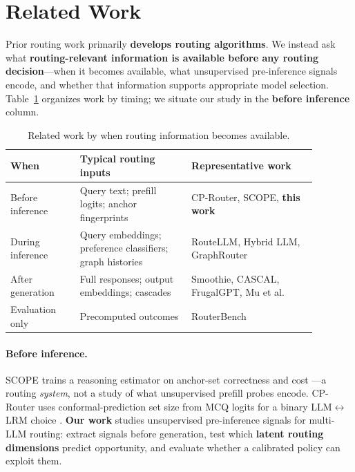 
\section{Related Work}
\label{sec:related}

Prior routing work primarily \textbf{develops routing algorithms}.
We instead ask what \textbf{routing-relevant information is available before any routing decision}---when it becomes available, what unsupervised pre-inference signals encode, and whether that information supports appropriate model selection.
Table~\ref{tab:landscape} organizes work by timing; we situate our study in the \textbf{before inference} column.

\begin{table}[t]
  \centering
  \small
  \begin{tabular}{p{0.20\linewidth}p{0.32\linewidth}p{0.36\linewidth}}
    \toprule
    \textbf{When} & \textbf{Typical routing inputs} & \textbf{Representative work} \\
    \midrule
    Before inference &
      Query text; prefill logits; anchor fingerprints &
      CP-Router, SCOPE, \textbf{this work} \\
    During inference &
      Query embeddings; preference classifiers; graph histories &
      RouteLLM, Hybrid LLM, GraphRouter \\
    After generation &
      Full responses; output embeddings; cascades &
      Smoothie, CASCAL, FrugalGPT, Mu et al. \\
    Evaluation only &
      Precomputed outcomes &
      RouterBench \\
    \bottomrule
  \end{tabular}
  \caption{Related work by when routing information becomes available.}
  \label{tab:landscape}
\end{table}

\paragraph{Before inference.}
SCOPE trains a reasoning estimator on anchor-set correctness and cost \citep{cao2026scope}---a routing \emph{system}, not a study of what unsupervised prefill probes encode.
CP-Router uses conformal-prediction set size from MCQ logits for a binary LLM$\leftrightarrow$LRM choice \citep{su2025cprouter}.
\textbf{Our work} studies unsupervised pre-inference signals for multi-LLM routing: extract signals before generation, test which \textbf{latent routing dimensions} predict opportunity, and evaluate whether a calibrated policy can exploit them.

